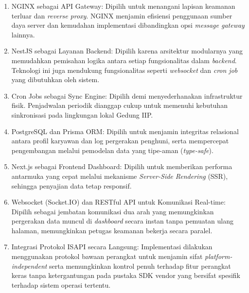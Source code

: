 \begin{enumerate}
    \item NGINX sebagai API Gateway: Dipilih untuk menangani lapisan keamanan terluar dan \textit{reverse proxy}. NGINX menjamin efisiensi penggunaan sumber daya server dan kemudahan implementasi dibandingkan opsi \textit{message gateway} lainnya.
    \item NestJS sebagai Layanan Backend: Dipilih karena arsitektur modularnya yang memudahkan pemisahan logika antara setiap fungsionalitas dalam \textit{backend}. Teknologi ini juga mendukung fungsionalitas seperti \textit{websocket} dan \textit{cron job} yang dibutuhkan oleh sistem.
    \item Cron Jobs sebagai Sync Engine: Dipilih demi menyederhanakan infrastruktur fisik. Penjadwalan periodik dianggap cukup untuk memenuhi kebutuhan sinkronisasi pada lingkungan lokal Gedung IIP.
    \item PostgreSQL dan Prisma ORM: Dipilih untuk menjamin integritas relasional antara profil karyawan dan log pergerakan penghuni, serta mempercepat pengembangan melalui pemodelan data yang tipe-aman (\textit{type-safe}).
    \item Next.js sebagai Frontend Dashboard: Dipilih untuk memberikan performa antarmuka yang cepat melalui mekanisme \textit{Server-Side Rendering} (SSR), sehingga penyajian data tetap responsif.
    \item Websocket (Socket.IO) dan RESTful API untuk Komunikasi Real-time: Dipilih sebagai jembatan komunikasi dua arah yang memungkinkan pergerakan data muncul di \textit{dashboard} secara instan tanpa pemuatan ulang halaman, memungkinkan petugas keamanan bekerja secara paralel.
    \item Integrasi Protokol ISAPI secara Langsung: Implementasi dilakukan menggunakan protokol bawaan perangkat untuk menjamin sifat \textit{platform-independent} serta memungkinkan kontrol penuh terhadap fitur perangkat keras tanpa ketergantungan pada pustaka SDK vendor yang bersifat spesifik terhadap sistem operasi tertentu.
\end{enumerate}
